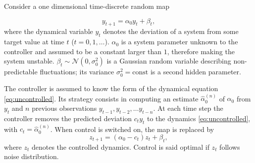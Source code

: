 \documentclass[FinalReport.tex]{subfiles}
\begin{document}
Consider a one dimensional time-discrete random map 

\begin{equation}\label{eq:uncontrolled}
	y_{t+1}=\alpha_0y_t + \beta_t,	
\end{equation}
where the dynamical variable $y_t$ denotes the deviation of a system from some target value at time $t$ ($t=0,1,\dots$). $\alpha_0$ is a system parameter unknown to the controller and assumed to be a constant larger than $1$, therefore making the system unstable. $\beta_t\sim\mathcal{N}(0,\sigma_0^2)$ is a Gaussian random variable describing non-predictable fluctuations; its variance $\sigma_0^2=\text{const}$ is a second hidden parameter.

The controller is assumed to know the form of the dynamical equation \eqref{eq:uncontrolled}. Its strategy consists in computing an estimate $\hat{\alpha}_0^{(n)}$ of $\alpha_0$ from $y_t$ and $n$ previous observations $y_{t-1},y_{t-2},\dots y_{t-n}$. At each time step the controller removes the predicted deviation $c_ty_t$ to the dynamics \eqref{eq:uncontrolled}, with $c_t=\hat{\alpha}_0^{(n)}$. When control is switched on, the map is replaced by
\begin{equation}\label{eq:map}
	z_{t+1}=(\alpha_0-c_t)z_t+\beta_t,	
\end{equation}
where $z_t$ denotes the controlled dynamics. Control is said optimal if $z_t$ follows noise distribution.
\end{document}
